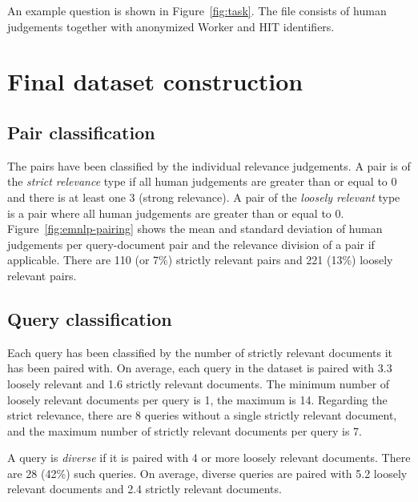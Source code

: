 An example question is shown in Figure~\ref{fig:task}. The  file consists of human judgements together with anonymized Worker and HIT identifiers.



\section{Final dataset construction}
\label{sec:postprocessing}

\subsection{Pair classification}

The pairs have been classified by the individual relevance judgements. A pair is of the \textit{strict relevance} type if all human judgements are greater than or equal to 0 and there is at least one 3 (strong relevance). A pair of the \textit{loosely   relevant} type is a pair where all human judgements are greater than or equal to 0. Figure~\ref{fig:emnlp-pairing} shows the mean and standard deviation of human judgements per query-document pair and the relevance division of a pair if applicable. There are 110 (or 7\%) strictly relevant pairs and 221 (13\%) loosely relevant pairs.
%
%
%

\subsection{Query classification}

Each query has been classified by the number of strictly relevant documents it has been paired with. On average, each query in the dataset is paired with 3.3 loosely relevant and 1.6 strictly relevant documents. The minimum number of loosely relevant documents per query is 1, the maximum is 14. Regarding the strict relevance, there are 8 queries without a single strictly relevant document, and the maximum number of strictly relevant documents per query is 7.

A query is \textit{diverse} if it is paired with 4 or more loosely relevant documents. There are 28 (42\%) such queries. On average, diverse queries are paired with 5.2 loosely relevant documents and 2.4 strictly relevant documents.


